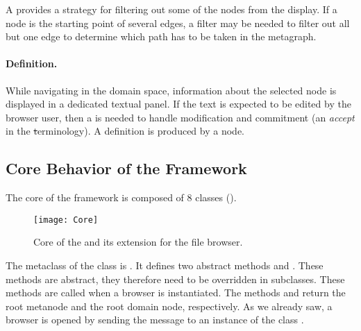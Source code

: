 \documentclass[a4paper,10pt,twoside]{book}
\begin{document}

A  provides a strategy for filtering out some of the nodes from the display. If a node is the starting point of several edges, a filter may be needed to filter out all but one edge to determine which path has to be taken in the metagraph. 

\paragraph{Definition.} While navigating in the domain space, information about the selected node is displayed in a dedicated textual panel. If the text is expected to be edited by the browser user, then a  is needed to handle modification and commitment (\ie an \emph{accept} in the \st terminology). A definition is produced by a node. 

\subsection{Core Behavior of the Framework}

The core of the \ob framework is composed of 8 classes ().

\begin{figure}[!ht]
\begin{center}
\texttt{[image: Core]}
\caption{Core of the \obf and its extension for the file browser.} 
\end{center}
\end{figure}

The metaclass of the class  is . It defines two abstract methods  and . These methods are abstract, they therefore need to be overridden in subclasses. These methods are called when a browser is instantiated. The methods   and  return the root metanode and the root domain node, respectively. As we already saw, a browser is opened by sending the message  to an instance of the class .
\end{document}
